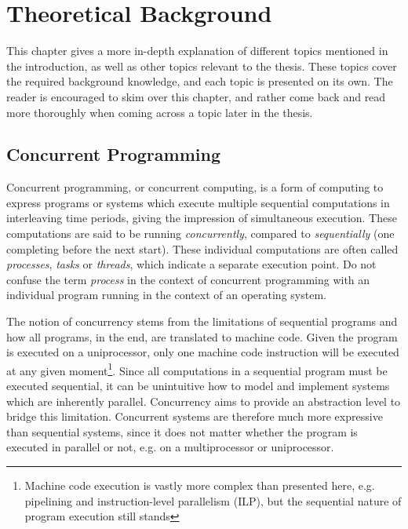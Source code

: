 

\chapter{Theoretical Background}
\label{ch:theoretical_background}


This chapter gives a more in\hyp{}depth explanation of different topics mentioned in the introduction, as well as other topics relevant to the thesis. These topics cover the required background knowledge, and each topic is presented on its own. The reader is encouraged to skim over this chapter, and rather come back and read more thoroughly when coming across a topic later in the thesis.


\section{Concurrent Programming}
\label{sec:concurrent_programming}


Concurrent programming, or concurrent computing, is a form of computing to express programs or systems which execute multiple sequential computations in interleaving time periods, giving the impression of simultaneous execution. These computations are said to be running \textit{concurrently}, compared to \textit{sequentially} (one completing before the next start). These individual computations are often called \textit{processes}, \textit{tasks} or \textit{threads}, which indicate a separate execution point. Do not confuse the term \textit{process} in the context of concurrent programming with an individual program running in the context of an operating system.

The notion of concurrency stems from the limitations of sequential programs and how all programs, in the end, are translated to machine code. Given the program is executed on a uniprocessor, only one machine code instruction will be executed at any given moment\footnote{Machine code execution is vastly more complex than presented here, e.g. pipelining and instruction\hyp{}level parallelism (ILP), but the sequential nature of program execution still stands}.  Since all computations in a sequential program must be executed sequential, it can be unintuitive how to model and implement systems which are inherently parallel. Concurrency aims to provide an abstraction level to bridge this limitation. Concurrent systems are therefore much more expressive than sequential systems, since it does not matter whether the program is executed in parallel or not, e.g. on a multiprocessor or uniprocessor.

